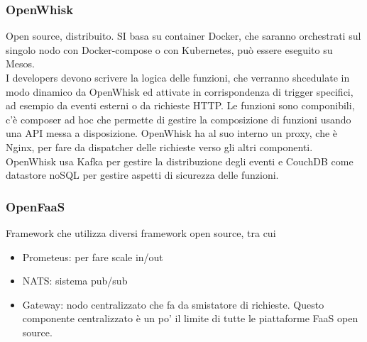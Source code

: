 \documentclass[16px]{article}
\begin{document}
\subsubsection{OpenWhisk}
Open source, distribuito. SI basa su container Docker, che saranno orchestrati sul singolo nodo con Docker-compose o con Kubernetes, può essere eseguito su Mesos.\\ I developers devono scrivere la logica delle funzioni, che verranno shcedulate in modo dinamico da OpenWhisk ed attivate in corrispondenza di trigger specifici, ad esempio da eventi esterni o da richieste HTTP. Le funzioni sono componibili, c'è composer ad hoc che permette di gestire la composizione di funzioni usando una API messa a disposizione. OpenWhisk ha al suo interno un proxy, che è Nginx, per fare da dispatcher delle richieste verso gli altri componenti. OpenWhisk usa Kafka per gestire la distribuzione degli eventi e CouchDB come datastore noSQL per gestire aspetti di sicurezza delle funzioni.
\subsubsection{OpenFaaS}
Framework che utilizza diversi framework open source, tra cui
\begin{itemize}
\item Prometeus: per fare scale in/out
\item NATS: sistema pub/sub
\item Gateway: nodo centralizzato che fa da smistatore di richieste. Questo componente centralizzato è un po' il limite di tutte le piattaforme FaaS open source.
\end{itemize}
\end{document}
